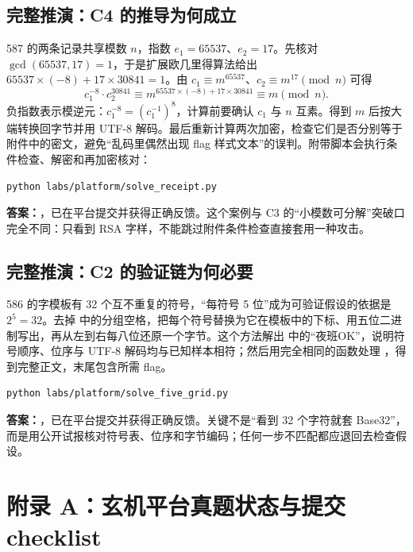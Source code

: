 \documentclass[UTF8,12pt,oneside]{ctexbook}
\begin{document}
\section{完整推演：C4 的推导为何成立}
587 的两条记录共享模数 $n$，指数 $e_1 = 65537$、$e_2 = 17$。先核对 $\gcd(65537, 17) = 1$，于是扩展欧几里得算法给出 $65537 \times (-8) + 17 \times 30841 = 1$。由 $c_1 \equiv m^{65537}$、$c_2 \equiv m^{17} \pmod n$ 可得
\[
c_1^{-8} \cdot c_2^{30841} \equiv m^{65537 \times (-8) + 17 \times 30841} \equiv m \pmod n.
\]
负指数表示模逆元：$c_1^{-8} = (c_1^{-1})^{8}$，计算前要确认 $c_1$ 与 $n$ 互素。得到 $m$ 后按大端转换回字节并用 UTF-8 解码。最后重新计算两次加密，检查它们是否分别等于附件中的密文，避免“乱码里偶然出现 flag 样式文本”的误判。附带脚本会执行条件检查、解密和再加密核对：
\begin{lstlisting}
python labs/platform/solve_receipt.py
\end{lstlisting}
\textbf{答案：}，已在平台提交并获得正确反馈。这个案例与 C3 的“小模数可分解”突破口完全不同：只看到 RSA 字样，不能跳过附件条件检查直接套用一种攻击。

\section{完整推演：C2 的验证链为何必要}
586 的字模板有 32 个互不重复的符号，“每符号 5 位”成为可验证假设的依据是 $2^5 = 32$。去掉  中的分组空格，把每个符号替换为它在模板中的下标、用五位二进制写出，再从左到右每八位还原一个字节。这个方法解出  中的“夜班OK”，说明符号顺序、位序与 UTF-8 解码均与已知样本相符；然后用完全相同的函数处理 ，得到完整正文，末尾包含所需 flag。
\begin{lstlisting}
python labs/platform/solve_five_grid.py
\end{lstlisting}
\textbf{答案：}，已在平台提交并获得正确反馈。关键不是“看到 32 个字符就套 Base32”，而是用公开试报核对符号表、位序和字节编码；任何一步不匹配都应退回去检查假设。

\chapter*{附录 A：玄机平台真题状态与提交 checklist}
\end{document}
